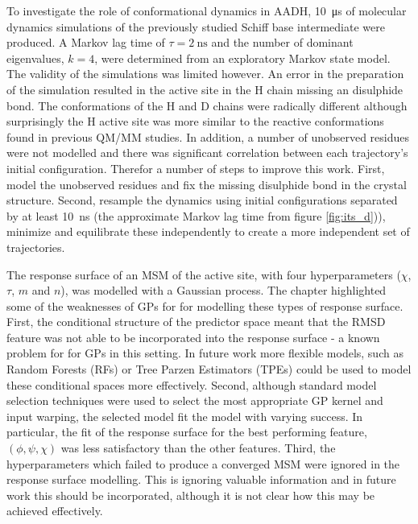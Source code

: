To investigate the role of conformational dynamics in AADH, \SI{10}{\micro\second} of molecular dynamics simulations of the previously studied Schiff base intermediate were produced. A Markov lag time of $\tau=\SI{2}{\nano\second}$ and the number of dominant eigenvalues, $k=4$, were determined from an exploratory Markov state model. The validity of the simulations was limited however. An error in the preparation of the simulation resulted in the active site in the H chain missing an disulphide bond. The conformations of the H and D chains were radically different although surprisingly the H active site was more similar to the reactive conformations found in previous QM/MM studies. In addition, a number of unobserved residues were not modelled and there was significant correlation between each trajectory's initial configuration. Therefor a number of steps to improve this work. First, model the unobserved residues and fix the missing disulphide bond in the crystal structure. Second, resample the dynamics using initial configurations separated by at least \SI{10}{\nano\second} (the approximate Markov lag time from figure \ref{fig:its_d})), minimize and equilibrate these independently to create a more independent set of trajectories. 

The response surface of an MSM of the active site, with four hyperparameters ($\chi$, $\tau$, $m$ and $n$), was modelled with a Gaussian process. The chapter highlighted some of the weaknesses of GPs for for modelling these types of response surface. First, the conditional structure of the predictor space meant that the RMSD feature was not able to be incorporated into the response surface - a known problem for for GPs in this setting. In future work more flexible models, such as Random Forests (RFs) or Tree Parzen Estimators (TPEs) could be used to model these conditional spaces more effectively. Second, although standard model selection techniques were used to select the most appropriate GP kernel and input warping, the selected model fit the model with varying success. In particular, the fit of the response surface for the best performing feature, $(\phi, \psi, \chi)$  was less satisfactory than the other features. Third, the hyperparameters which failed to produce a converged MSM were ignored in the response surface modelling. This is ignoring valuable information and in future work this should be incorporated, although it is not clear how this may be achieved effectively. 

